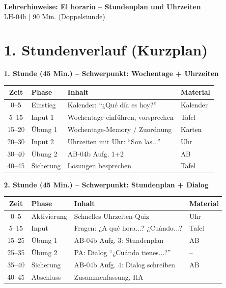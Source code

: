 \documentclass[11pt, a4paper]{article}
\newcommand{\fachfarbe}{spanisch}
\newcommand{\thema}{El horario -- Stundenplan und Uhrzeiten}
\newcommand{\sequenz}{04}
\newcommand{\block}{b}
\newcommand{\dauer}{90 Min. (Doppelstunde)}
\begin{document}

\begin{center}
    {\Large\bfseries\textcolor{\fachfarbe}{Lehrerhinweise: \thema}}\\[0.3em]
    {\normalsize LH-\sequenz\block{} | \dauer}
\end{center}

\vspace{10pt}


\section*{1. Stundenverlauf (Kurzplan)}

\textbf{1. Stunde (45 Min.) -- Schwerpunkt: Wochentage + Uhrzeiten}

\begin{tabularx}{\textwidth}{|c|l|X|l|}
\hline
\textbf{Zeit} & \textbf{Phase} & \textbf{Inhalt} & \textbf{Material} \\
\hline
0--5 & Einstieg & Kalender: ``¿Qué día es hoy?'' & Kalender \\
\hline
5--15 & Input 1 & Wochentage einführen, vorsprechen & Tafel \\
\hline
15--20 & Übung 1 & Wochentage-Memory / Zuordnung & Karten \\
\hline
20--30 & Input 2 & Uhrzeiten mit Uhr: ``Son las...'' & Uhr \\
\hline
30--40 & Übung 2 & AB-04b Aufg. 1+2 & AB \\
\hline
40--45 & Sicherung & Lösungen besprechen & Tafel \\
\hline
\end{tabularx}

\vspace{1em}

\textbf{2. Stunde (45 Min.) -- Schwerpunkt: Stundenplan + Dialog}

\begin{tabularx}{\textwidth}{|c|l|X|l|}
\hline
\textbf{Zeit} & \textbf{Phase} & \textbf{Inhalt} & \textbf{Material} \\
\hline
0--5 & Aktivierung & Schnelles Uhrzeiten-Quiz & Uhr \\
\hline
5--15 & Input & Fragen: ¿A qué hora...? ¿Cuándo...? & Tafel \\
\hline
15--25 & Übung 1 & AB-04b Aufg. 3: Stundenplan & AB \\
\hline
25--35 & Übung 2 & PA: Dialog ``¿Cuándo tienes...?'' & -- \\
\hline
35--40 & Sicherung & AB-04b Aufg. 4: Dialog schreiben & AB \\
\hline
40--45 & Abschluss & Zusammenfassung, HA & -- \\
\hline
\end{tabularx}
\end{document}
